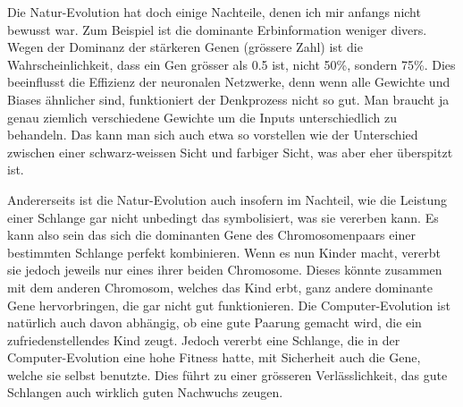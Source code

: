 \documentclass[10pt,a4paper,ngerman,english]{article}
\begin{document}
Die Natur-Evolution hat doch einige Nachteile, denen ich mir anfangs nicht bewusst war. Zum Beispiel ist die dominante Erbinformation weniger divers. Wegen der Dominanz der stärkeren Genen (grössere Zahl) ist die Wahrscheinlichkeit, dass ein Gen grösser als 0.5 ist, nicht 50\%, sondern 75\%. Dies beeinflusst die Effizienz der neuronalen Netzwerke, denn wenn alle Gewichte und Biases ähnlicher sind, funktioniert der Denkprozess nicht so gut. Man braucht ja genau ziemlich verschiedene Gewichte um die Inputs unterschiedlich zu behandeln. Das kann man sich auch etwa so vorstellen wie der Unterschied zwischen einer schwarz-weissen Sicht und farbiger Sicht, was aber eher überspitzt ist.

Andererseits ist die Natur-Evolution auch insofern im Nachteil, wie die Leistung einer Schlange gar nicht unbedingt das symbolisiert, was sie vererben kann. Es kann also sein das sich die dominanten Gene des Chromosomenpaars einer bestimmten Schlange perfekt kombinieren. Wenn es nun Kinder macht, vererbt sie jedoch jeweils nur eines ihrer beiden Chromosome. Dieses könnte zusammen mit dem anderen Chromosom, welches das Kind erbt, ganz andere dominante Gene hervorbringen, die gar nicht gut funktionieren. Die Computer-Evolution ist natürlich auch davon abhängig, ob eine gute Paarung gemacht wird, die ein zufriedenstellendes Kind zeugt. Jedoch vererbt eine Schlange, die in der Computer-Evolution eine hohe Fitness hatte, mit Sicherheit auch die Gene, welche sie selbst benutzte. Dies führt zu einer grösseren Verlässlichkeit, das gute Schlangen auch wirklich guten Nachwuchs zeugen.
\end{document}
